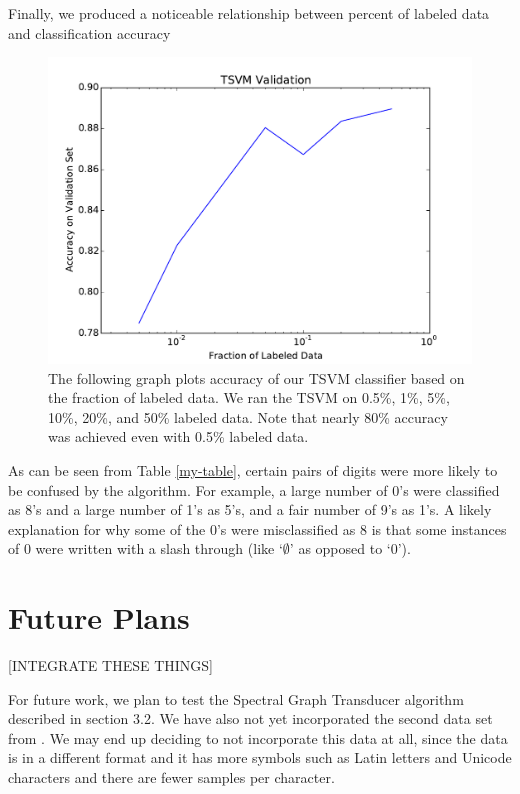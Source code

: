 \documentclass[11pt]{article}
\begin{document}
Finally, we produced a noticeable relationship between percent of labeled data and classification accuracy \par

\begin{figure}
  \centering
  \caption{The following graph plots accuracy of our TSVM classifier based on the fraction of labeled data. We ran the TSVM on 0.5\%, 1\%, 5\%, 10\%, 20\%, and 50\% labeled data. Note that nearly 80\% accuracy was achieved even with 0.5\% labeled data.}
  \includegraphics[width=5in]{tsvm.pdf}
\end{figure}


As can be seen from Table \ref{my-table}, certain pairs of digits were more likely to be confused by the algorithm. For example, a large number of 0's were classified as 8's and a large number of 1's as 5's, and a fair number of 9's as 1's. A likely explanation for why
some of the 0's were misclassified as 8 is that some instances of 0 were written with a slash through (like `$\emptyset$' as opposed to `0').

\section{Future Plans}

[INTEGRATE THESE THINGS]

For future work, we plan to test the Spectral Graph Transducer algorithm described in section 3.2. We have also not yet incorporated the second data set from \cite{Llorens:2008}. We may end up deciding to not incorporate this data at all, since the data is in a different format and it has more symbols such as Latin letters and Unicode characters and there are fewer samples per character.
\end{document}
